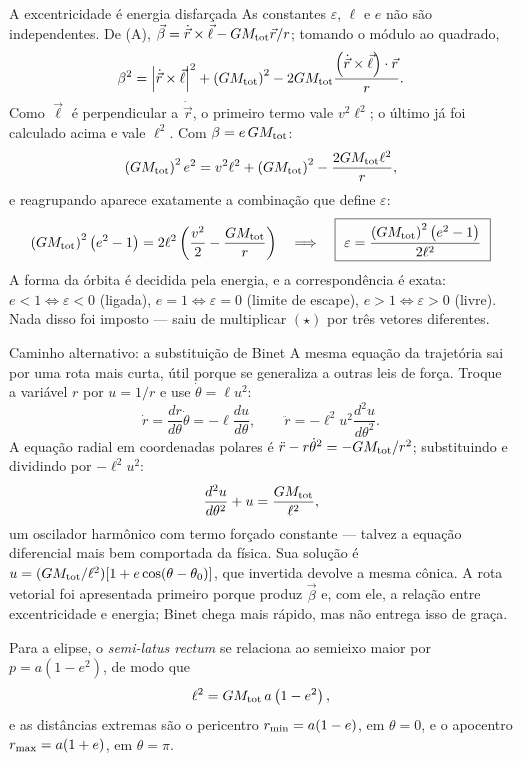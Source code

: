 \documentclass[11pt,a4paper]{article}
\begin{document}
\begin{lessonblock}[borderline west={2pt}{0pt}{astroGold}]{A excentricidade é energia disfarçada}
As constantes $\varepsilon$, $\ell$ e $e$ não são independentes. De (A), $\vec{\beta}=\dot{\vec{r}}\times\vec{\ell}-GM_{\rm tot}\vec{r}/r$; tomando o módulo ao quadrado,
\[
\beta^{2}=\left|\dot{\vec{r}}\times\vec{\ell}\right|^{2}
+\left(GM_{\rm tot}\right)^{2}
-2GM_{\rm tot}\frac{\left(\dot{\vec{r}}\times\vec{\ell}\right)\cdot\vec{r}}{r}.
\]
Como $\vec{\ell}$ é perpendicular a $\dot{\vec{r}}$, o primeiro termo vale $v^{2}\ell^{2}$; o último já foi
calculado acima e vale $\ell^{2}$. Com $\beta=e\,GM_{\rm tot}$:
\[
\left(GM_{\rm tot}\right)^{2}e^{2}
=v^{2}\ell^{2}+\left(GM_{\rm tot}\right)^{2}-\frac{2GM_{\rm tot}\ell^{2}}{r},
\]
e reagrupando aparece exatamente a combinação que define $\varepsilon$:
\[
\left(GM_{\rm tot}\right)^{2}\left(e^{2}-1\right)
=2\ell^{2}\left(\frac{v^{2}}{2}-\frac{GM_{\rm tot}}{r}\right)
\quad\Longrightarrow\quad
\boxed{\ \varepsilon=\frac{\left(GM_{\rm tot}\right)^{2}\left(e^{2}-1\right)}{2\ell^{2}}\ }
\]
A forma da órbita é decidida pela energia, e a correspondência é exata: $e<1\Leftrightarrow\varepsilon<0$
(ligada), $e=1\Leftrightarrow\varepsilon=0$ (limite de escape), $e>1\Leftrightarrow\varepsilon>0$ (livre).
Nada disso foi imposto --- saiu de multiplicar $(\star)$ por três vetores diferentes.
\end{lessonblock}

\begin{lessonblock}{Caminho alternativo: a substituição de Binet}
A mesma equação da trajetória sai por uma rota mais curta, útil porque se generaliza a outras leis de força.
Troque a variável $r$ por $u=1/r$ e use $\dot{\theta}=\ell u^{2}$:
\[
\dot{r}=\frac{dr}{d\theta}\dot{\theta}=-\ell\frac{du}{d\theta},
\qquad
\ddot{r}=-\ell^{2}u^{2}\frac{d^{2}u}{d\theta^{2}}.
\]
A equação radial em coordenadas polares é $\ddot{r}-r\dot{\theta}^{2}=-GM_{\rm tot}/r^{2}$; substituindo e
dividindo por $-\ell^{2}u^{2}$:
\[
\frac{d^{2}u}{d\theta^{2}}+u=\frac{GM_{\rm tot}}{\ell^{2}},
\]
um oscilador harmônico com termo forçado constante --- talvez a equação diferencial mais bem comportada da
física. Sua solução é $u=(GM_{\rm tot}/\ell^{2})[1+e\cos(\theta-\theta_0)]$, que invertida devolve a mesma
cônica. A rota vetorial foi apresentada primeiro porque produz $\vec{\beta}$ e, com ele, a relação entre
excentricidade e energia; Binet chega mais rápido, mas não entrega isso de graça.
\end{lessonblock}

Para a elipse, o \textit{semi-latus rectum} se relaciona ao semieixo maior por $p=a(1-e^{2})$, de modo que
\[
\ell^{2}=GM_{\rm tot}\,a\left(1-e^{2}\right),
\]
e as distâncias extremas são o pericentro $r_{\rm min}=a(1-e)$, em $\theta=0$, e o apocentro
$r_{\rm max}=a(1+e)$, em $\theta=\pi$.
\end{document}
